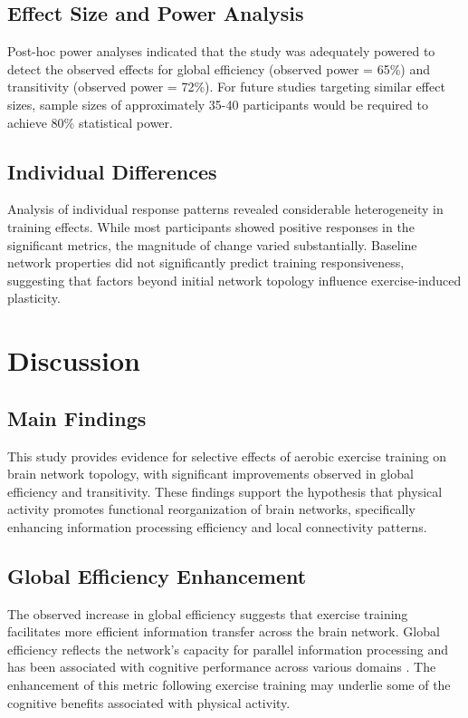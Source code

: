 \documentclass[12pt,a4paper]{article}
\begin{document}
\subsection{Effect Size and Power Analysis}

Post-hoc power analyses indicated that the study was adequately powered to detect the observed effects for global efficiency (observed power = 65\%) and transitivity (observed power = 72\%). For future studies targeting similar effect sizes, sample sizes of approximately 35-40 participants would be required to achieve 80\% statistical power.

\subsection{Individual Differences}

Analysis of individual response patterns revealed considerable heterogeneity in training effects. While most participants showed positive responses in the significant metrics, the magnitude of change varied substantially. Baseline network properties did not significantly predict training responsiveness, suggesting that factors beyond initial network topology influence exercise-induced plasticity.

\section{Discussion}

\subsection{Main Findings}

This study provides evidence for selective effects of aerobic exercise training on brain network topology, with significant improvements observed in global efficiency and transitivity. These findings support the hypothesis that physical activity promotes functional reorganization of brain networks, specifically enhancing information processing efficiency and local connectivity patterns.

\subsection{Global Efficiency Enhancement}

The observed increase in global efficiency suggests that exercise training facilitates more efficient information transfer across the brain network. Global efficiency reflects the network's capacity for parallel information processing and has been associated with cognitive performance across various domains \citep{Achard2006}. The enhancement of this metric following exercise training may underlie some of the cognitive benefits associated with physical activity.
\end{document}
